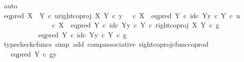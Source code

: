 \begin{isabellebody}
\ auto\isanewline
\isanewline
\ \ \ \ \isamarkupfalse%
\ {\isachardoublequoteopen}eq{\isacharunderscore}{\kern0pt}pred\ {\isacharparenleft}{\kern0pt}X\ {\isasymCoprod}\ Y{\isacharparenright}{\kern0pt}\ {\isasymcirc}\isactrlsub c\ {\isasymlangle}u{\isacharcomma}{\kern0pt}right{\isacharunderscore}{\kern0pt}coproj\ X\ Y\ {\isasymcirc}\isactrlsub c\ y{\isasymrangle}\ {\isacharequal}{\kern0pt}\ {\isacharparenleft}{\kern0pt}{\isasymf}\ {\isasymcirc}\isactrlsub c\ {\isasymbeta}\isactrlbsub X\isactrlesub {\isacharparenright}{\kern0pt}\ {\isasymamalg}\ {\isacharparenleft}{\kern0pt}eq{\isacharunderscore}{\kern0pt}pred\ Y\ {\isasymcirc}\isactrlsub c\ {\isasymlangle}id\isactrlsub c\ Y{\isacharcomma}{\kern0pt}y\ {\isasymcirc}\isactrlsub c\ {\isasymbeta}\isactrlbsub Y\isactrlesub {\isasymrangle}{\isacharparenright}{\kern0pt}\ {\isasymcirc}\isactrlsub c\ u{\isachardoublequoteclose}\isanewline
\ \ \ \ \isamarkupfalse%
\ {\isacharminus}{\kern0pt}\isanewline
\ \ \ \ \ \ \isamarkupfalse%
\ {\isachardoublequoteopen}{\isacharparenleft}{\kern0pt}{\isasymf}\ {\isasymcirc}\isactrlsub c\ {\isasymbeta}\isactrlbsub X\isactrlesub {\isacharparenright}{\kern0pt}\ {\isasymamalg}\ {\isacharparenleft}{\kern0pt}eq{\isacharunderscore}{\kern0pt}pred\ Y\ {\isasymcirc}\isactrlsub c\ {\isasymlangle}id\isactrlsub c\ Y{\isacharcomma}{\kern0pt}y\ {\isasymcirc}\isactrlsub c\ {\isasymbeta}\isactrlbsub Y\isactrlesub {\isasymrangle}{\isacharparenright}{\kern0pt}\ {\isasymcirc}\isactrlsub c\ right{\isacharunderscore}{\kern0pt}coproj\ X\ Y\ {\isasymcirc}\isactrlsub c\ g\isanewline
\ \ \ \ \ \ \ \ \ \ {\isacharequal}{\kern0pt}\ {\isacharparenleft}{\kern0pt}eq{\isacharunderscore}{\kern0pt}pred\ Y\ {\isasymcirc}\isactrlsub c\ {\isasymlangle}id\isactrlsub c\ Y{\isacharcomma}{\kern0pt}y\ {\isasymcirc}\isactrlsub c\ {\isasymbeta}\isactrlbsub Y\isactrlesub {\isasymrangle}{\isacharparenright}{\kern0pt}\ {\isasymcirc}\isactrlsub c\ g{\isachardoublequoteclose}\isanewline
\ \ \ \ \ \ \ \ \isamarkupfalse%
\ {\isacharparenleft}{\kern0pt}typecheck{\isacharunderscore}{\kern0pt}cfuncs{\isacharcomma}{\kern0pt}\ simp\ add{\isacharcolon}{\kern0pt}\ comp{\isacharunderscore}{\kern0pt}associative{}\ right{\isacharunderscore}{\kern0pt}coproj{\isacharunderscore}{\kern0pt}cfunc{\isacharunderscore}{\kern0pt}coprod{\isacharparenright}{\kern0pt}\isanewline
\ \ \ \ \ \ \isamarkupfalse%
\ \isamarkupfalse%
\ {\isachardoublequoteopen}{\isachardot}{\kern0pt}{\isachardot}{\kern0pt}{\isachardot}{\kern0pt}\ {\isacharequal}{\kern0pt}\ eq{\isacharunderscore}{\kern0pt}pred\ Y\ {\isasymcirc}\isactrlsub c\ {\isasymlangle}g{\isacharcomma}{\kern0pt}y{\isasymrangle}{\isachardoublequoteclose}\isanewline

\end{isabellebody}
